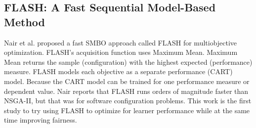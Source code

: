 \documentclass[10pt,conference,review]{IEEEtran}
\begin{document}
\subsection{FLASH: A Fast Sequential Model-Based Method}
Nair et al. \cite{8469102} proposed a fast SMBO approach called FLASH for multiobjective optimization. FLASH's acquisition function uses Maximum Mean. Maximum Mean returns the sample (configuration) with the highest expected (performance) measure. FLASH models each objective as a separate performance (CART) model. Because the CART model can be trained for one performance measure or dependent value. Nair reports that FLASH runs orders of magnitude faster than NSGA-II, but that was for software configuration problems. This work is the first study to try using  FLASH to optimize for learner performance while at the same time improving fairness.
\end{document}
